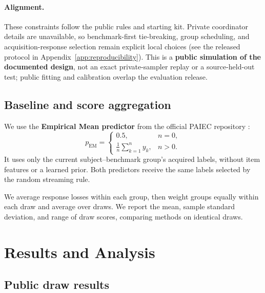 \documentclass{article}
\begin{document}
\paragraph{Alignment.}
These constraints follow the public rules and starting kit. Private coordinator details are unavailable, so benchmark-first tie-breaking, group scheduling, and acquisition-response selection remain explicit local choices (see the released protocol in Appendix~\ref{app:reproducibility}). This is a \textbf{public simulation of the documented design}, not an exact private-sampler replay or a source-held-out test; public fitting and calibration overlap the evaluation release.

\subsection{Baseline and score aggregation}

We use the \textbf{Empirical Mean predictor} from the official PAIEC repository \citep{paiec_baselines}:
\[
 p_{\mathrm{EM}}=
 \begin{cases}
  0.5, & n=0,\\
  \frac{1}{n}\sum_{k=1}^{n}y_k, & n>0.
 \end{cases}
\]
It uses only the current subject--benchmark group's acquired labels, without item features or a learned prior. Both predictors receive the same labels selected by the random streaming rule.

We average response losses within each group, then weight groups equally within each draw and average over \ProxyDraws{} draws. We report the mean, sample standard deviation, and range of draw scores, comparing methods on identical draws.

\section{Results and Analysis}

\subsection{Public draw results}



\begin{table}[H]
\centering
\small
\setlength{\tabcolsep}{4pt}

\vspace{6pt}
\caption{Public formative-simulation Brier scores: equal groups within each draw, then equal weight across \ProxyDraws{} draws. Both predictors share evaluation pools and randomly acquired labels. Lower is better.}
\label{tab:proxy}
\end{table}
\end{document}
